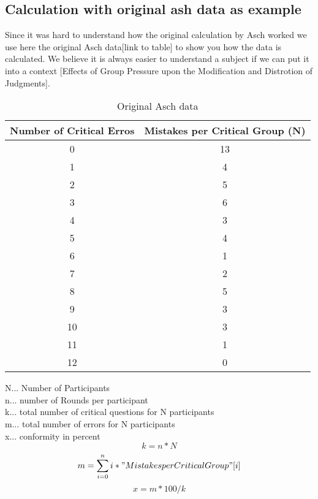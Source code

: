 \documentclass{acm_proc_article-sp}
\begin{document}
\subsection{Calculation with original ash data as example}
Since it was hard to understand how the original calculation by Asch worked we use here the original Asch data[link to table] to show you how the data is calculated. We believe it is always easier to understand a subject if we can put it into a context [Effects of Group Pressure upon the Modification and Distrotion of Judgments]. 

\begin{table}
\centering
\caption{Original Asch data}
\begin{tabular}{|c|c|} \hline
Number of Critical Erros&Mistakes per Critical Group (N)\\ \hline
0 & 13\\ \hline
1 & 4\\ \hline
2 & 5\\ \hline
3 & 6\\ \hline
4 & 3\\ \hline
5 & 4\\ \hline
6 & 1\\ \hline
7 & 2\\ \hline
8 & 5\\ \hline
9 & 3\\ \hline
10 & 3\\ \hline
11 & 1\\ \hline
12 & 0\\ \hline
\hline\end{tabular}
\label{tab:ashTable1}
\end{table}

N... Number of Participants\\
n... number of Rounds per participant\\
k... total number of critical questions for N participants\\
m... total number of errors for N participants\\
x... conformity in percent \\


\begin{equation}k=n*N\end{equation}
\begin{equation}m=\sum\limits_{i=0}^n i * "Mistakes per Critical Group"[i] \end{equation}
\begin{equation}x=m*100/k\end{equation}
\end{document}
